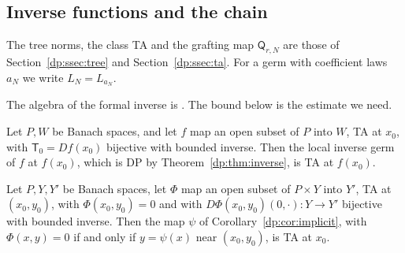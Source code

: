\subsection{Inverse functions and the chain}\label{dp:ssec:chain}

The tree norms, the class TA and the grafting map $\mathsf Q_{r,N}$ are those of Section~\ref{dp:ssec:tree} and Section~\ref{dp:ssec:ta}. For a germ with coefficient laws $a_N$ we write $L_N=L_{a_N}$.

The algebra of the formal inverse is \cite[Th.~VI.3, Prop.~VI.8]{Ro}. The bound below is the estimate we need.

\begin{theorem}\label{dp:thm:ta-inverse}
Let $P,W$ be Banach spaces, and let $f$ map an open subset of $P$ into $W$, TA at $x_0$, with $\mathsf T_0=Df(x_0)$ bijective with bounded inverse. Then the local inverse germ of $f$ at $f(x_0)$, which is DP by Theorem~\ref{dp:thm:inverse}, is TA at $f(x_0)$.

Let $P,Y,Y'$ be Banach spaces, let $\Phi$ map an open subset of $P\times Y$ into $Y'$, TA at $(x_0,y_0)$, with $\Phi(x_0,y_0)=0$ and with $D\Phi(x_0,y_0)(0,\cdot)\colon Y\to Y'$ bijective with bounded inverse. Then the map $\psi$ of Corollary~\ref{dp:cor:implicit}, with $\Phi(x,y)=0$ if and only if $y=\psi(x)$ near $(x_0,y_0)$, is TA at $x_0$.
\end{theorem}

